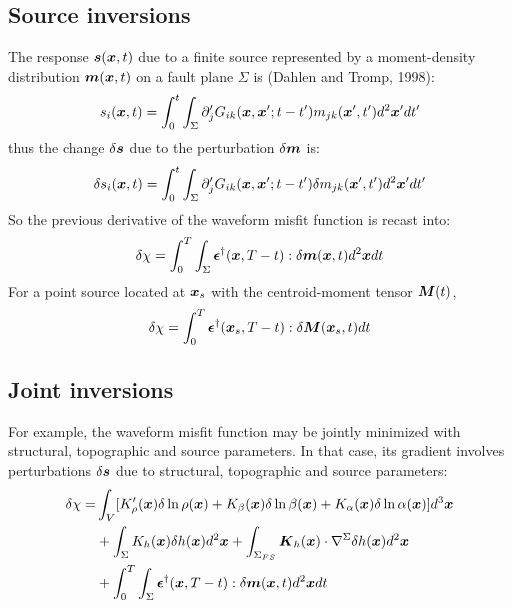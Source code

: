 \subsection{Source inversions}
The response $\boldsymbol{s}(\boldsymbol{x},t)$ due to a finite source
represented by a moment-density distribution $\boldsymbol{m}(\boldsymbol{x},t)$ on a fault plane $\Sigma$
is (Dahlen and Tromp, 1998):
\[ s_i(\boldsymbol{x},t)=\int_0^t\int_\Sigma\partial_j' G_{ik}(\boldsymbol{x},\boldsymbol{x}';t-t')m_{jk}(\boldsymbol{x}',t')d^2\boldsymbol{x}'dt' \]
thus the change $\delta\boldsymbol{s}$ due to the perturbation $\delta\boldsymbol{m}$ is:
\[ \delta s_i(\boldsymbol{x},t)=\int_0^t\int_\Sigma\partial_j' G_{ik}(\boldsymbol{x},\boldsymbol{x}';t-t')\delta m_{jk}(\boldsymbol{x}',t')d^2\boldsymbol{x}'dt' \]
So the previous \Frechet derivative of the waveform misfit function is recast into:
\[ \delta\chi=\int_0^T\int_\Sigma\boldsymbol{\epsilon}^\dagger(\boldsymbol{x},T-t):\delta\boldsymbol{m}(\boldsymbol{x},t)d^2\boldsymbol{x}dt \]
For a point source located at $\boldsymbol{x}_s$ with the centroid-moment tensor $\boldsymbol{M}(t)$,
\[ \delta\chi=\int_0^T\boldsymbol{\epsilon}^\dagger(\boldsymbol{x}_s,T-t):\delta\boldsymbol{M}(\boldsymbol{x}_s,t)dt \]

\subsection{Joint inversions}
For example, the waveform misfit function may be jointly minimized with structural,
topographic and source parameters.
In that case, its gradient involves perturbations $\delta\boldsymbol{s}$ due to structural,
topographic and source parameters:
\begin{align*}
  \delta\chi= & \int_V[K_\rho'(\boldsymbol{x})\delta\ln\rho(\boldsymbol{x})+K_\beta(\boldsymbol{x})\delta\ln\beta(\boldsymbol{x})+K_\alpha(\boldsymbol{x})\delta\ln\alpha(\boldsymbol{x})]d^3\boldsymbol{x} \\
    & +\int_\Sigma K_h(\boldsymbol{x})\delta h(\boldsymbol{x})d^2\boldsymbol{x}+\int_{\Sigma_{FS}}\boldsymbol{K}_h(\boldsymbol{x})\cdot\nabla^\Sigma\delta h(\boldsymbol{x})d^2\boldsymbol{x} \\
	& +\int_0^T\int_\Sigma\boldsymbol{\epsilon}^\dagger(\boldsymbol{x},T-t):\delta\boldsymbol{m}(\boldsymbol{x},t)d^2\boldsymbol{x}dt
\end{align*}

